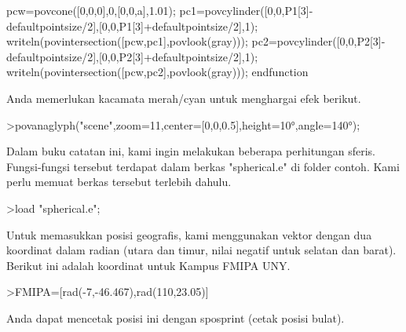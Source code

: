 \documentclass[a4paper,10pt]{article}
\begin{document}
\begin{eulernotebook}
\begin{eulercomment}
\begin{eulercomment}
\begin{eulercomment}
\begin{eulercomment}
\begin{eulercomment}
\begin{eulercomment}
\begin{eulercomment}
\begin{eulercomment}
\begin{eulercomment}
\begin{eulercomment}
\begin{eulercomment}
\begin{eulercomment}
\begin{eulercomment}
\begin{eulercomment}
\begin{eulercomment}
\begin{eulercomment}
\begin{eulercomment}
\begin{eulercomment}
\begin{eulercomment}
\begin{eulercomment}
\begin{eulercomment}
\begin{eulercomment}
\begin{eulercomment}
\begin{eulercomment}
\begin{eulercomment}
\begin{eulercomment}
\begin{eulercomment}
\begin{eulercomment}
\begin{eulercomment}
\begin{eulercomment}
\begin{eulerudf}
  pcw=povcone([0,0,0],0,[0,0,a],1.01);
  pc1=povcylinder([0,0,P1[3]-defaultpointsize/2],[0,0,P1[3]+defaultpointsize/2],1);
  writeln(povintersection([pcw,pc1],povlook(gray)));
  pc2=povcylinder([0,0,P2[3]-defaultpointsize/2],[0,0,P2[3]+defaultpointsize/2],1);
  writeln(povintersection([pcw,pc2],povlook(gray)));
  endfunction
\end{eulerudf}
\begin{eulercomment}
Anda memerlukan kacamata merah/cyan untuk menghargai efek berikut.
\end{eulercomment}
\begin{eulerprompt}
>povanaglyph("scene",zoom=11,center=[0,0,0.5],height=10°,angle=140°);
\end{eulerprompt}
\begin{eulercomment}
Dalam buku catatan ini, kami ingin melakukan beberapa perhitungan
sferis. Fungsi-fungsi tersebut terdapat dalam berkas "spherical.e" di
folder contoh. Kami perlu memuat berkas tersebut terlebih dahulu.
\end{eulercomment}
\begin{eulerprompt}
>load "spherical.e";
\end{eulerprompt}
\begin{eulercomment}
Untuk memasukkan posisi geografis, kami menggunakan vektor dengan dua
koordinat dalam radian (utara dan timur, nilai negatif untuk selatan
dan barat). Berikut ini adalah koordinat untuk Kampus FMIPA UNY.
\end{eulercomment}
\begin{eulerprompt}
>FMIPA=[rad(-7,-46.467),rad(110,23.05)]
\end{eulerprompt}
\begin{euleroutput}
  [-0.13569,  1.92657]
\end{euleroutput}
\begin{eulercomment}
Anda dapat mencetak posisi ini dengan sposprint (cetak posisi bulat).
\end{eulercomment}

\end{eulercomment}
\end{eulercomment}
\end{eulercomment}
\end{eulercomment}
\end{eulercomment}
\end{eulercomment}
\end{eulercomment}
\end{eulercomment}
\end{eulercomment}
\end{eulercomment}
\end{eulercomment}
\end{eulercomment}
\end{eulercomment}
\end{eulercomment}
\end{eulercomment}
\end{eulercomment}
\end{eulercomment}
\end{eulercomment}
\end{eulercomment}
\end{eulercomment}
\end{eulercomment}
\end{eulercomment}
\end{eulercomment}
\end{eulercomment}
\end{eulercomment}
\end{eulercomment}
\end{eulercomment}
\end{eulercomment}
\end{eulercomment}
\end{eulercomment}
\end{eulernotebook}
\end{document}
